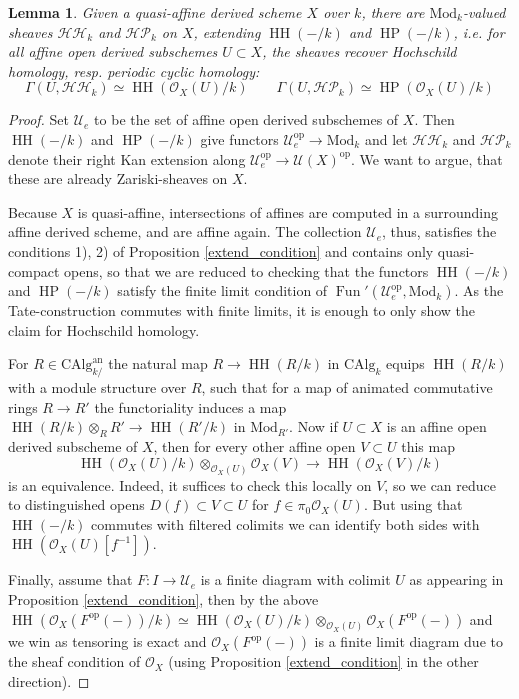 \documentclass[10pt, reqno]{amsart}
\newtheorem{lemma}[theorem]{Lemma}
\theoremstyle{definition}
\theoremstyle{remark}
\newcommand{\CAlg}{\mathrm{CAlg}}
\newcommand{\op}{\mathrm{op}}
\renewcommand{\O}{\mathcal O}
\newcommand{\Mod}{\mathrm{Mod}}
\newcommand{\an}{\mathrm{an}}
\newcommand{\U}{\mathcal{U}}
\newcommand{\shvHH}{\mathcal{HH}}
\newcommand{\shvHP}{\mathcal{HP}}
\DeclareMathOperator{\HH}{\mathrm{HH}}
\DeclareMathOperator{\HP}{\mathrm{HP}}
\DeclareMathOperator{\Fun}{\mathrm{Fun}}
\begin{document}
\begin{lemma}
	Given a quasi-affine derived scheme $X$ over $k$, there are $\Mod_k$-valued sheaves $\shvHH_k$ and $\shvHP_k$ on $X$, extending $\HH(-/k)$ and $\HP(-/k)$, i.e. for all affine open derived subschemes $U\subset X$, the sheaves recover Hochschild homology, resp. periodic cyclic homology:
	\[\Gamma(U,\shvHH_k)\simeq\HH(\O_X(U)/k)\qquad \Gamma(U,\shvHP_k)\simeq\HP(\O_X(U)/k)\]
\end{lemma}
\begin{proof}
	Set $\U_e$ to be the set of affine open derived subschemes of $X$. Then $\HH(-/k)$ and $\HP(-/k)$ give functors $\U_e^\op\to \Mod_k$ and let $\shvHH_k$ and $\shvHP_k$ denote their right Kan extension along $\U_e^\op\to\U(X)^\op$. We want to argue, that these are already Zariski-sheaves on $X$. 
	
	Because $X$ is quasi-affine, intersections of affines are computed in a surrounding affine derived scheme, and are affine again. The collection $\U_e$, thus, satisfies the conditions 1), 2) of Proposition \ref{extend_condition} and contains only quasi-compact opens, so that we are reduced to checking that the functors $\HH(-/k)$ and $\HP(-/k)$ satisfy the finite limit condition of $\Fun'(\U_e^\op,\Mod_k)$. As the Tate-construction commutes with finite limits, it is enough to only show the claim for Hochschild homology.
	
	For $R\in\CAlg_{k/}^\an$ the natural map $R\to\HH(R/k)$ in $\CAlg_k$ equips $\HH(R/k)$ with a module structure over $R$, such that for a map of animated commutative rings $R\to R'$ the functoriality induces a map $\HH(R/k)\otimes_RR'\to\HH(R'/k)$ in $\Mod_{R'}$. Now if $U\subset X$ is an affine open derived subscheme of $X$, then for every other affine open $V\subset U$ this map 
	\[\HH(\O_X(U)/k)\otimes_{\O_X(U)}\O_X(V)\to\HH(\O_X(V)/k)\]
	is an equivalence. Indeed, it suffices to check this locally on $V$, so we can reduce to distinguished opens $D(f)\subset V\subset U$ for $f\in\pi_0\O_X(U)$. But using that $\HH(-/k)$ commutes with filtered colimits we can identify both sides with $\HH(\O_X(U)[f^{-1}])$.
	
	Finally, assume that $F:I\to\U_e$ is a finite diagram with colimit $U$ as appearing in Proposition \ref{extend_condition}, then by the above $\HH(\O_X(F^\op(-))/k)\simeq\HH(\O_X(U)/k)\otimes_{\O_X(U)}\O_X(F^\op(-))$ and we win as tensoring is exact and $\O_X(F^\op(-))$ is a finite limit diagram due to the sheaf condition of $\O_X$ (using Proposition \ref{extend_condition} in the other direction).
\end{proof}
\end{document}
